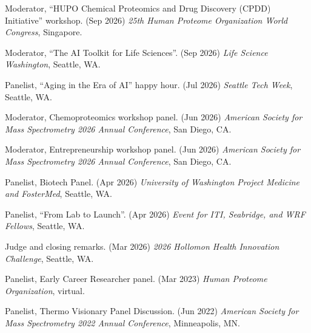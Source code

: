 \documentclass[11pt]{article}
\begin{document}
\begin{etaremune}

    \item Moderator, ``HUPO Chemical Proteomics and Drug Discovery (CPDD) Initiative'' workshop. (Sep 2026) \textit{25th Human Proteome Organization World Congress}, Singapore.

    \item Moderator, ``The AI Toolkit for Life Sciences''. (Sep 2026) \textit{Life Science Washington}, Seattle, WA.

    \item Panelist, ``Aging in the Era of AI'' happy hour. (Jul 2026) \textit{Seattle Tech Week}, Seattle, WA.

    \item Moderator, Chemoproteomics workshop panel. (Jun 2026) \textit{American Society for Mass Spectrometry 2026 Annual Conference}, San Diego, CA.

    \item Moderator, Entrepreneurship workshop panel. (Jun 2026) \textit{American Society for Mass Spectrometry 2026 Annual Conference}, San Diego, CA.

    \item Panelist, Biotech Panel. (Apr 2026) \textit{University of Washington Project Medicine and FosterMed}, Seattle, WA.

    \item Panelist, ``From Lab to Launch''. (Apr 2026) \textit{Event for ITI, Seabridge, and WRF Fellows}, Seattle, WA.

    \item Judge and closing remarks. (Mar 2026) \textit{2026 Hollomon Health Innovation Challenge}, Seattle, WA.

    \item Panelist, Early Career Researcher panel. (Mar 2023) \textit{Human Proteome Organization}, virtual.

    \item Panelist, Thermo Visionary Panel Discussion. (Jun 2022) \textit{American Society for Mass Spectrometry 2022 Annual Conference}, Minneapolis, MN.

\end{etaremune}
\end{document}
